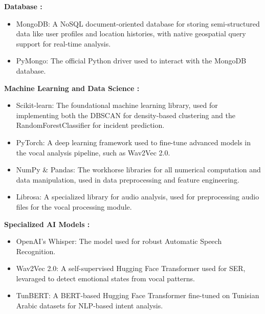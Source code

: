 \documentclass[12pt,a4paper,oneside,english]{book}
\begin{document}
\textbf{Database :}
\begin{itemize}
\item MongoDB: A NoSQL document-oriented database for storing semi-structured data like user profiles and location histories, with native geospatial query support for real-time analysis.
\item PyMongo: The official Python driver used to interact with the MongoDB database.
\end{itemize}

\textbf{Machine Learning and Data Science :}

\begin{itemize}

\item Scikit-learn: The foundational machine learning library, used for implementing both the DBSCAN for density-based clustering and the RandomForestClassifier for incident prediction.
\item PyTorch: A deep learning framework used to fine-tune advanced models in the vocal analysis pipeline, such as Wav2Vec 2.0.
\item NumPy \& Pandas: The workhorse libraries for all numerical computation and data manipulation, used in data preprocessing and feature engineering.
\item Librosa: A specialized library for audio analysis, used for preprocessing audio files for the vocal processing module.
\end{itemize}

\textbf{Specialized AI Models :}
\begin{itemize}
\item OpenAI's Whisper: The model used for robust Automatic Speech Recognition.
\item Wav2Vec 2.0: A self-supervised Hugging Face Transformer used for SER, levaraged to detect emotional states from vocal patterns.
\item TunBERT: A BERT-based Hugging Face Transformer fine-tuned on Tunisian Arabic datasets for NLP-based intent analysis.%
\end{itemize}
\end{document}
